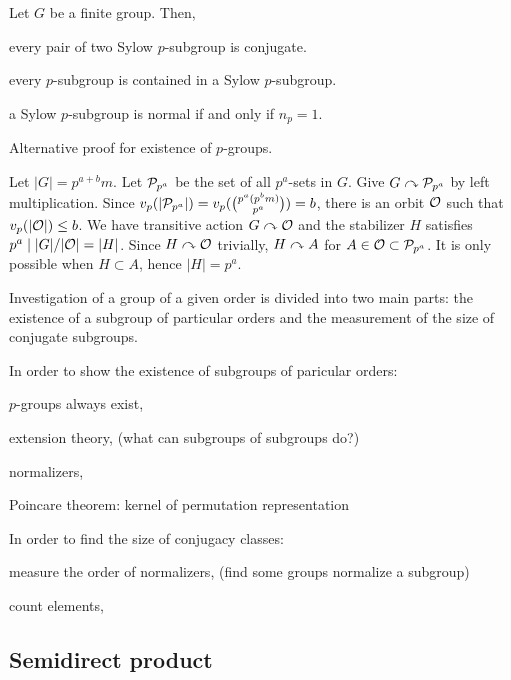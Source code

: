 \documentclass{../exp}
\begin{document}
\begin{cor}
Let $G$ be a finite group.
Then,
\begin{cond}
\item every pair of two Sylow $p$-subgroup is conjugate.
\item every $p$-subgroup is contained in a Sylow $p$-subgroup.
\item a Sylow $p$-subgroup is normal if and only if $n_p=1$.
\end{cond}
\end{cor}

\begin{thm}
Alternative proof for existence of $p$-groups.
\end{thm}
\begin{pf}
Let $|G|=p^{a+b}m$.
Let $\mathcal{P}_{p^a}$ be the set of all $p^a$-sets in $G$.
Give $G\curvearrowright\mathcal{P}_{p^a}$ by left multiplication.
Since $v_p(|\mathcal{P}_{p^a}|)=v_p({p^a(p^bm)\choose p^a})=b$, there is an orbit $\mathcal{O}$ such that $v_p(|\mathcal{O}|)\le b$.
We have transitive action $G\curvearrowright\mathcal{O}$ and the stabilizer $H$ satisfies $p^a\mid|G|/|\mathcal{O}|=|H|$.
Since $H\curvearrowright\mathcal{O}$ trivially, $H\curvearrowright A$ for $A\in\mathcal{O}\subset\mathcal{P}_{p^a}$.
It is only possible when $H\subset A$, hence $|H|=p^a$.
\end{pf}

Investigation of a group of a given order is divided into two main parts: the existence of a subgroup of particular orders and the measurement of the size of conjugate subgroups.

In order to show the existence of subgroups of paricular orders:
\begin{cond}
\item $p$-groups always exist,
\item extension theory, (what can subgroups of subgroups do?)
\item normalizers,
\item Poincare theorem: kernel of permutation representation
\end{cond}

In order to find the size of conjugacy classes:
\begin{cond}
\item measure the order of normalizers, (find some groups normalize a subgroup)
\item count elements,
\end{cond}


\subsection{Semidirect product}
\end{document}
